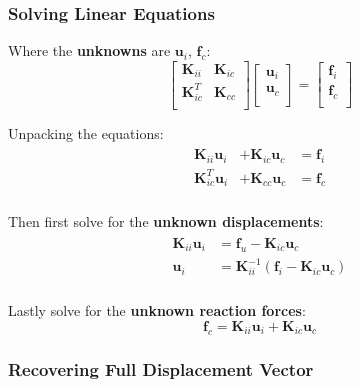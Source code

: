 \documentclass[10pt,b5paper,titlepage]{book}
\newcommand{\m}{\mathbf}
\newenvironment{eqarray}
{
    \begin{eqnarray}
        \begin{aligned}
}
{
        \end{aligned}
    \end{eqnarray}
}
\begin{document}
\subsubsection{Solving Linear Equations}

Where the \textbf{unknowns} are $ \m{u}_i $, $ \m{f}_c $:
\begin{equation}
    \begin{bmatrix}
        \m{K}_{ii} & \m{K}_{ic} \\
        \m{K}_{ic}^T & \m{K}_{cc} \\
    \end{bmatrix}
    \begin{bmatrix}
        \boxed{\m{u}_i} \\
        \m{u}_c \\
    \end{bmatrix}
    = \begin{bmatrix}
        \m{f}_i \\
        \boxed{\m{f}_c} \\
    \end{bmatrix}
\end{equation}

Unpacking the equations:
\begin{eqarray}
    \m{K}_{ii} \boxed{\m{u}_i} &+ \m{K}_{ic} \m{u}_c &= \m{f}_i \\
    \m{K}_{ic}^T \boxed{\m{u}_i} &+ \m{K}_{cc} \m{u}_c &= \boxed{\m{f}_c} \\
\end{eqarray}

Then first solve for the \textbf{unknown displacements}:
\begin{eqarray}
    \m{K}_{ii} \boxed{\m{u}_i} &= \m{f}_u - \m{K}_{ic} \m{u}_c \\
    \boxed{\m{u}_i} &= \m{K}_{ii}^{-1} \left( \m{f}_i - \m{K}_{ic} \m{u}_c \right) \\
\end{eqarray}

Lastly solve for the \textbf{unknown reaction forces}:
\begin{equation}
    \boxed{\m{f}_c} = \m{K}_{ii} \m{u}_i + \m{K}_{ic} \m{u}_c
\end{equation}


\subsubsection{Recovering Full Displacement Vector}
\end{document}
